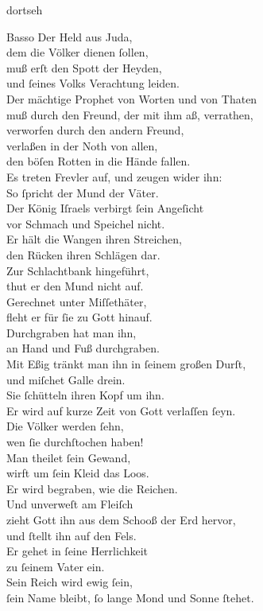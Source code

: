 \documentclass[tocstyle=ref-genre]{ees}
\begin{document}
{\begin{movement}{dortseh}
  \item[Basso]
  Der Held aus Juda,\\
  dem die Völker dienen ſollen,\\
  muß erſt den Spott der Heyden,\\
  und ſeines Volks Verachtung leiden.\\
  Der mächtige Prophet von Worten und von Thaten\\
  muß durch den Freund, der mit ihm aß, verrathen,\\
  verworfen durch den andern Freund,\\
  verlaßen in der Noth von allen,\\
  den böſen Rotten in die Hände fallen.\\
  Es treten Frevler auf, und zeugen wider ihn:\\
  So ſpricht der Mund der Väter.\\
  Der König Iſraels verbirgt ſein Angeſicht\\
  vor Schmach und Speichel nicht.\\
  Er hält die Wangen ihren Streichen,\\
  den Rücken ihren Schlägen dar.\\
  Zur Schlachtbank hingeführt,\\
  thut er den Mund nicht auf.\\
  Gerechnet unter Miſſethäter,\\
  fleht er für ſie zu Gott hinauf.\\
  Durchgraben hat man ihn,\\
  an Hand und Fuß durchgraben.\\
  Mit Eßig tränkt man ihn in ſeinem großen Durſt,\\
  und miſchet Galle drein.\\
  Sie ſchütteln ihren Kopf um ihn.\\
  Er wird auf kurze Zeit von Gott verlaſſen ſeyn.\\
  Die Völker werden ſehn,\\
  wen ſie durchſtochen haben!\\
  Man theilet ſein Gewand,\\
  wirft um ſein Kleid das Loos.\\
  Er wird begraben, wie die Reichen.\\
  Und unverweſt am Fleiſch\\
  zieht Gott ihn aus dem Schooß der Erd hervor,\\
  und ſtellt ihn auf den Fels.\\
  Er gehet in ſeine Herrlichkeit\\
  zu ſeinem Vater ein.\\
  Sein Reich wird ewig ſein,\\
  ſein Name bleibt, ſo lange Mond und Sonne ſtehet.


\end{movement}}
\end{document}
